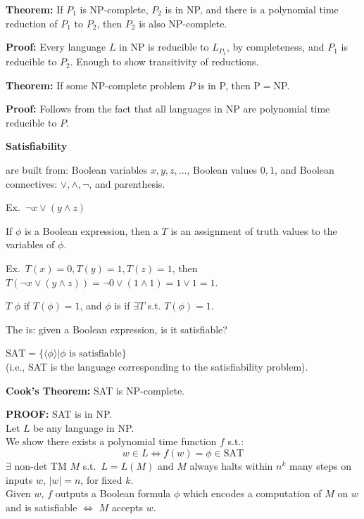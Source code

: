 \begin{frame}

{\bf Theorem:}  If $P_1$ is NP-complete, $P_2$ is in NP, and there is
a polynomial time reduction of $P_1$ to $P_2$, then $P_2$ is also
NP-complete.

{\bf Proof:} Every language $L$ in NP is reducible to
$L_{P_1}$, by completeness, and $P_1$ is reducible to $P_2$.  Enough
to show transitivity of reductions.

{\bf Theorem:}  If some NP-complete problem $P$ is in P, then P$=$NP.

{\bf Proof:}  Follows from the fact that all languages in
NP are polynomial time reducible to $P$.

\end{frame}

\begin{frame}

{\bf Satisfiability}

 are built from: Boolean variables
$x,y,z,\ldots$, Boolean values $0,1$, and Boolean connectives:
$\vee,\wedge,\neg$, and parenthesis.

Ex.\ $\neg x\vee(y\wedge z)$

If $\phi$ is a Boolean expression, then a  $T$ is
an assignment of truth values to the variables of $\phi$.

Ex.\ $T(x)=0,T(y)=1,T(z)=1$, then $T(\neg x\vee(y\wedge
z))=\neg 0\vee(1\wedge 1)=1\vee 1=1$.

$T$  $\phi$ if $T(\phi)=1$,
and $\phi$ is  if $\exists T$ s.t. $T(\phi)=1$.
\end{frame}

\begin{frame}
The  is: given a Boolean expression,
is it satisfiable?

$\text{SAT}=\{\langle\phi\rangle|\text{$\phi$ is
satisfiable}\}$ \\ (i.e., SAT is the language corresponding to the
satisfiability problem).

{\bf Cook's Theorem:} SAT is NP-complete.

{\bf PROOF:}  SAT is in NP. \\
Let $L$ be any language in NP.  \\
We show there exists a polynomial time function $f$ s.t.:
$$
w\in L\iff f(w)=\phi\in\text{SAT}
$$
$\exists$ non-det TM $M$ s.t.\ $L=L(M)$ and $M$ always halts
within $n^k$ many steps on inputs $w$, $|w|=n$, for fixed $k$.  \\
Given $w$, $f$ outputs a Boolean formula $\phi$ which encodes a
computation of $M$ on $w$ and is satisfiable $\iff$ $M$ accepts $w$.
\end{frame}




